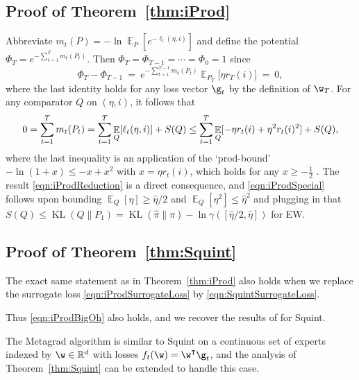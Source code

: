 \documentclass{colt2018} %
\DeclareMathOperator*{\E}{\mathbb{E}}
\DeclareMathOperator{\kl}{KL}
\renewcommand{\top}{\intercal}
\newcommand{\reals}{\mathbb{R}}
\newcommand{\half}{\frac{1}{2}}
\newcommand{\sloss}{\ell}                       %
\newcommand{\sregret}{S}                        %
\newcommand{\etaopt}{\hat{\eta}}                %
\newcommand{\postpi}{\hat{\pi}}                 %
\begin{document}
\subsection{Proof of Theorem~\ref{thm:iProd}}
\label{sec:iProdProof}

Abbreviate $m_t(P) = -\ln
\E_{P}\left[e^{-\sloss_t(\eta,i)}\right]$ and define the
potential $\Phi_T = e^{-\sum_{t=1}^T m_t(P_t)}$. Then
$\Phi_T = \Phi_{T-1} = \cdots = \Phi_0 = 1$ since
% 
\[
  \Phi_T - \Phi_{T-1}
    ~=~ e^{-\sum_{t=1}^{T-1} m_t(P_t)} \E_{P_T}\big[\eta r_T(i)\big] 
    ~=~ 0,
\]
% 
where the last identity holds for any loss vector $\g_t$ by the
definition of $\w_T$. For any comparator $Q$ on $(\eta,i)$, it follows
that
% 
\[
  0 = \sum_{t=1}^T m_t(P_t)
    = \sum_{t=1}^T \E_{Q}[\sloss_t(\eta,i)] + \sregret(Q)\\
    \leq \sum_{t=1}^T \E_{Q}[-\eta r_t(i) + \eta^2 r_t(i)^2] +
    \sregret(Q),
\]
% 
where the last inequality is an application of the `prod-bound'
$-\ln(1+x) \leq -x + x^2$ with $x = \eta r_t(i)$, which holds for any
$x \geq -\half$ \citep[Lemma~1]{CesaBianchiMansourStoltz2007}. The
result \eqref{eqn:iProdReduction} is a direct consequence, and
\eqref{eqn:iProdSpecial} follows upon bounding $\E_Q[\eta] \geq
\etaopt/2$ and $\E_Q[\eta^2] \leq \etaopt^2$ and plugging in that
$\sregret(Q) \leq \kl(Q\|P_1) = \kl(\postpi\|\pi) - \ln
\gamma([\etaopt/2,\etaopt])$ for EW.

\subsection{Proof of Theorem~\ref{thm:Squint}}
\label{sec:SquintProof}

\begin{theorem}\label{thm:Squint}
  The exact same statement as in Theorem~\ref{thm:iProd} also holds when
  we replace the surrogate loss \eqref{eqn:iProdSurrogateLoss} by
  \eqref{eqn:SquintSurrogateLoss}.
\end{theorem}
% 
Thus \eqref{eqn:iProdBigOh} also holds, and we recover the results of
\citep{KoolenVanErven2015} for Squint.

\begin{remark}
  The Metagrad algorithm \citep{VanErvenKoolen2016} is similar to Squint
  on a continuous set of experts indexed by $\w \in \reals^d$ with
  losses $f_t(\w) = \w^\top\g_t$, and the analysis of
  Theorem~\ref{thm:Squint} can be extended to handle this case.
\end{remark}
\end{document}
